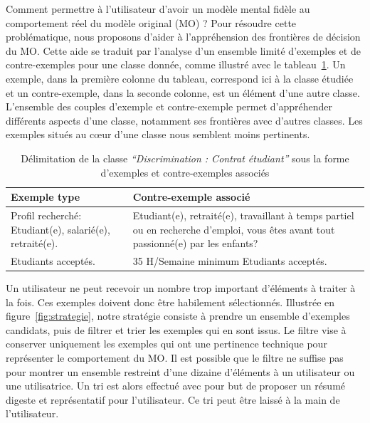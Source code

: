 Comment permettre à l'utilisateur d'avoir un modèle mental fidèle au comportement réel du modèle original (MO) ? Pour résoudre cette problématique, nous proposons d'aider à l'appréhension des frontières de décision du MO. Cette aide se traduit par l'analyse d'un ensemble limité d'exemples et de contre-exemples pour une classe donnée, comme illustré avec le tableau~\ref{tab:illus_e_cfe}. Un exemple, dans la première colonne du tableau, correspond ici à la classe étudiée et un contre-exemple, dans la seconde colonne, est un élément d'une autre classe. L'ensemble des couples d'exemple et contre-exemple permet d'appréhender différents aspects d'une classe, notamment ses frontières avec d'autres classes. Les exemples situés au c\oe ur d'une classe nous semblent moins pertinents.

\begin{table}[htpb!]
    \caption{Délimitation de la classe \textit{``Discrimination : Contrat étudiant''}  sous la forme d'exemples et contre-exemples associés} \label{tab:illus_e_cfe}
    \begin{tabular}{|p{}|p{}|} \hline
    \textbf{Exemple type}                                            & \textbf{Contre-exemple associé}     \\ \hline
    Profil recherché: Etudiant(e), salarié(e), retraité(e). & Etudiant(e), retraité(e), travaillant à temps partiel ou   en recherche d'emploi, vous êtes avant tout passionné(e) par les enfants? \\ \hline
    Etudiants acceptés.                                     & 35 H/Semaine minimum Etudiants acceptés. \\ \hline
    \end{tabular}
\end{table}

Un utilisateur ne peut recevoir un nombre trop important d'éléments à traiter à la fois. Ces exemples doivent donc être habilement sélectionnés. Illustrée en figure~\ref{fig:strategie}, notre stratégie consiste à prendre un ensemble d'exemples candidats, puis de filtrer et trier les exemples qui en sont issus. Le filtre vise à conserver uniquement les exemples qui ont une pertinence technique pour représenter le comportement du MO. Il est possible que le filtre ne suffise pas pour montrer un ensemble restreint d'une dizaine d'éléments à un utilisateur ou une utilisatrice. Un tri est alors effectué avec pour but de proposer un résumé digeste et représentatif pour l'utilisateur. Ce tri peut être laissé à la main de l'utilisateur.


